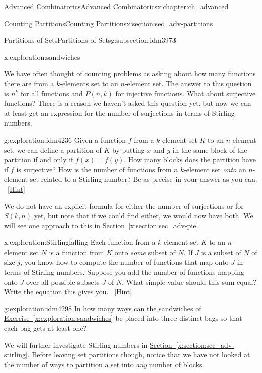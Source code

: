 \documentclass[oneside,10pt,]{book}
\numberwithin{equation}{chapter}
\begin{document}
\begin{chapterptx}{Advanced Combinatorics}{}{Advanced Combinatorics}{}{}{x:chapter:ch_advanced}
\begin{sectionptx}{Counting Partitions}{}{Counting Partitions}{}{}{x:section:sec_adv-partitions}
\begin{subsectionptx}{Partitions of Sets}{}{Partitions of Sets}{}{}{g:subsection:idm3973}
\begin{exploration}{}{x:exploration:sandwiches}
\end{exploration}
We have often thought of counting problems as asking about how many functions there are from a \(k\)-elements set to an \(n\)-element set.  The answer to this question is \(n^k\) for all functions and \(P(n,k)\) for injective functions.  What about surjective functions?  There is a reason we haven't asked this question yet, but now we can at least get an expression for the number of surjections in terms of Stirling numbers.%
\begin{exploration}{}{g:exploration:idm4236}%
Given a function \(f\) from a \(k\)-element set \(K\) to an \(n\)-element set, we can define a partition of \(K\) by putting \(x\) and \(y\) in the same block of the partition if and only if \(f(x)=f(y)\). How many blocks does the partition have if \(f\) is surjective? How is the number of functions from a \(k\)-element set \emph{onto} an \(n\)-element set related to a Stirling number? Be as precise in your answer as you can.%
\qquad~\hfill{\tiny\hyperlink{g:hint:idm4257-back}{[Hint]}}\end{exploration}
We do not have an explicit formula for either the number of surjections or for \(S(k,n)\) yet, but note that if we could find either, we would now have both.  We will see one approach to this in \hyperref[x:section:sec_adv-pie]{Section~\ref{x:section:sec_adv-pie}}.%
\begin{exploration}{}{x:exploration:Stirlingfalling}%
Each function from a \(k\)-element set \(K\) to an \(n\)-element set \(N\) is a function from \(K\) onto \emph{some} subset of \(N\). If \(J\) is a subset of \(N\) of size \(j\), you know how to compute the number of functions that map onto \(J\) in terms of Stirling numbers. Suppose you add the number of functions mapping onto \(J\) over all possible subsets \(J\) of \(N\). What simple value should this sum equal? Write the equation this gives you.%
\qquad~\hfill{\tiny\hyperlink{g:hint:idm4287-back}{[Hint]}}\end{exploration}
\begin{exploration}{}{g:exploration:idm4298}%
In how many ways can the sandwiches of \hyperref[x:exploration:sandwiches]{Exercise~\ref{x:exploration:sandwiches}} be placed into three distinct bags so that each bag gets at least one?%
\end{exploration}
We will further investigate Stirling numbers in \hyperref[x:section:sec_adv-stirling]{Section~\ref{x:section:sec_adv-stirling}}.  Before leaving set partitions though, notice that we have not looked at the number of ways to partition a set into \emph{any} number of blocks.%

\end{subsectionptx}
\end{sectionptx}
\end{chapterptx}
\end{document}

